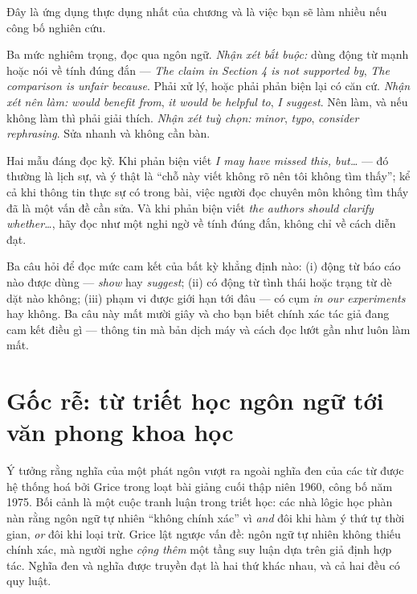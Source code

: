 \documentclass[../../english.tex]{subfiles}
\begin{document}
Đây là ứng dụng thực dụng nhất của chương và là việc bạn sẽ làm nhiều nếu công bố nghiên cứu.

Ba mức nghiêm trọng, đọc qua ngôn ngữ. \emph{Nhận xét bắt buộc:} dùng động từ mạnh hoặc nói về tính đúng đắn --- \emph{The claim in Section 4 is not supported by}, \emph{The comparison is unfair because}. Phải xử lý, hoặc phải phản biện lại có căn cứ. \emph{Nhận xét nên làm:} \emph{would benefit from}, \emph{it would be helpful to}, \emph{I suggest}. Nên làm, và nếu không làm thì phải giải thích. \emph{Nhận xét tuỳ chọn:} \emph{minor}, \emph{typo}, \emph{consider rephrasing}. Sửa nhanh và không cần bàn.

Hai mẫu đáng đọc kỹ. Khi phản biện viết \emph{I may have missed this, but\ldots} --- đó thường là lịch sự, và ý thật là ``chỗ này viết không rõ nên tôi không tìm thấy''; kể cả khi thông tin thực sự có trong bài, việc người đọc chuyên môn không tìm thấy đã là một vấn đề cần sửa. Và khi phản biện viết \emph{the authors should clarify whether\ldots}, hãy đọc như một nghi ngờ về tính đúng đắn, không chỉ về cách diễn đạt.

\begin{cannho}
Ba câu hỏi để đọc mức cam kết của bất kỳ khẳng định nào: (i) động từ báo cáo nào được dùng --- \emph{show} hay \emph{suggest}; (ii) có động từ tình thái hoặc trạng từ dè dặt nào không; (iii) phạm vi được giới hạn tới đâu --- có cụm \emph{in our experiments} hay không. Ba câu này mất mười giây và cho bạn biết chính xác tác giả đang cam kết điều gì --- thông tin mà bản dịch máy và cách đọc lướt gần như luôn làm mất.
\end{cannho}

\section{Gốc rễ: từ triết học ngôn ngữ tới văn phong khoa học}

Ý tưởng rằng nghĩa của một phát ngôn vượt ra ngoài nghĩa đen của các từ được hệ thống hoá bởi Grice trong loạt bài giảng cuối thập niên 1960, công bố năm 1975\cite{grice1975}. Bối cảnh là một cuộc tranh luận trong triết học: các nhà lôgic học phàn nàn rằng ngôn ngữ tự nhiên ``không chính xác'' vì \emph{and} đôi khi hàm ý thứ tự thời gian, \emph{or} đôi khi loại trừ. Grice lật ngược vấn đề: ngôn ngữ tự nhiên không thiếu chính xác, mà người nghe \emph{cộng thêm} một tầng suy luận dựa trên giả định hợp tác. Nghĩa đen và nghĩa được truyền đạt là hai thứ khác nhau, và cả hai đều có quy luật.
\end{document}
